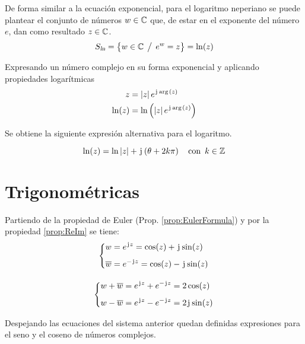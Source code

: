 De forma similar a la ecuación exponencial, para el logaritmo neperiano se puede plantear el conjunto de números $w \in \mathbb{C}$ que, de estar en el exponente del número $e$, dan como resultado $z \in \mathbb{C}$.
\begin{equation*}
    {{S}_\textsl{{ln}}} = { \left\{ {w \in \mathbb{C} \hspace{1ex} \big/ \hspace{1ex} e^w = z} \right\} } = \ln(z)
\end{equation*}

Expresando un número complejo en su forma exponencial y aplicando propiedades logarítmicas
\begin{align*}
    z &= {\left| {z} \right|} \, e^{\mkern2mu\mathrm{j}\mkern1mu \mathop{\mathrm{arg}}\mkern2mu(z)}
    \\
    \ln (z) &= \ln \left( {\left| {z} \right|} \, e^{\mkern2mu\mathrm{j}\mkern1mu \mathop{\mathrm{arg}}\mkern2mu(z)} \right)
\end{align*}

Se obtiene la siguiente expresión alternativa para el logaritmo.

\begin{mdframed}[style=PropertyFrame]
    \begin{prop}
    \end{prop}
    \begin{equation*}
        \ln(z) = \ln {\left| {z} \right|} + \mkern2mu\mathrm{j}\mkern1mu \left( \theta + 2 k\pi \right) \quad \textrm{con} \enspace k \in \mathbb{Z}
    \end{equation*}
\end{mdframed}


\section{Trigonométricas}

Partiendo de la propiedad de Euler (Prop. \ref{prop:EulerFormula}) y por la propiedad \ref{prop:ReIm} se tiene:
\begin{gather*}
    \left\{
    \begin{aligned}
        w &= e^{\mkern2mu\mathrm{j}\mkern1mu z} = \cos(z) + \mkern2mu\mathrm{j}\mkern1mu \sin(z)
        \\[1ex]
        \overline{w} &= e^{-\mkern2mu\mathrm{j}\mkern1mu z} = \cos(z) - \mkern2mu\mathrm{j}\mkern1mu \sin(z)
    \end{aligned}
    \right.
    \\[1em]
    \left\{
    \begin{aligned}
        w + \overline{w} &= e^{\mkern2mu\mathrm{j}\mkern1mu z} + e^{-\mkern2mu\mathrm{j}\mkern1mu z} = 2 \cos(z)
        \\[1ex]
        w - \overline{w} &= e^{\mkern2mu\mathrm{j}\mkern1mu z} - e^{-\mkern2mu\mathrm{j}\mkern1mu z} = 2 \mkern2mu\mathrm{j}\mkern1mu \sin(z)
    \end{aligned}
    \right.
\end{gather*}

Despejando las ecuaciones del sistema anterior quedan definidas expresiones para el seno y el coseno de números complejos.

